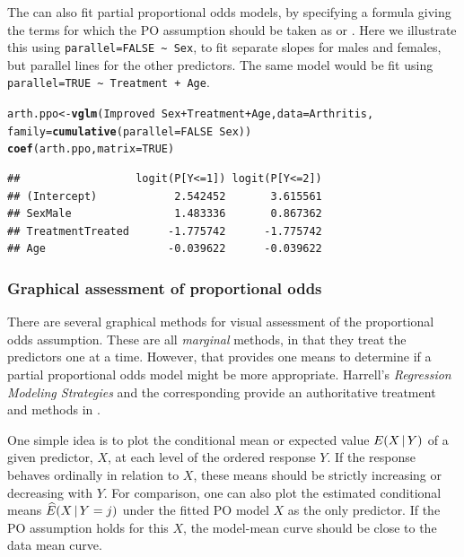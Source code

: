 \documentclass[11pt]{book}\usepackage[]{graphicx}\usepackage[]{color}
\makeatletter
\newcommand{\hlnum}[1]{\textcolor[rgb]{0.686,0.059,0.569}{#1}}%
\newcommand{\hlopt}[1]{\textcolor[rgb]{0,0,0}{#1}}%
\newcommand{\hlstd}[1]{\textcolor[rgb]{0.345,0.345,0.345}{#1}}%
\newcommand{\hlkwb}[1]{\textcolor[rgb]{0.69,0.353,0.396}{#1}}%
\newcommand{\hlkwc}[1]{\textcolor[rgb]{0.333,0.667,0.333}{#1}}%
\newcommand{\hlkwd}[1]{\textcolor[rgb]{0.737,0.353,0.396}{\textbf{#1}}}%
\newenvironment{kframe}{%
 \def\at@end@of@kframe{}%
 \ifinner\ifhmode%
  \def\at@end@of@kframe{\end{minipage}}%
  \begin{minipage}{\columnwidth}%
 \fi\fi%
 \def\FrameCommand##1{\hskip\@totalleftmargin \hskip-\fboxsep
 \colorbox{shadecolor}{##1}\hskip-\fboxsep
     \hskip-\linewidth \hskip-\@totalleftmargin \hskip\columnwidth}%
 \MakeFramed {\advance\hsize-\width
   \@totalleftmargin\z@ \linewidth\hsize
   \@setminipage}}%
 {\par\unskip\endMakeFramed%
 \at@end@of@kframe}
\newenvironment{knitrout}{}{} %
\renewenvironment{knitrout}{\small\renewcommand{\baselinestretch}{.85}}{} %
\makeatother
\begin{document}
The  can also fit partial proportional odds models, by specifying a
formula giving the terms for which the PO assumption should be taken as 
or .  Here we illustrate this using \verb|parallel=FALSE ~ Sex|, to fit
separate slopes for males and females, but parallel lines for the other predictors.
The same model would be fit using \verb|parallel=TRUE ~ Treatment + Age|.
\begin{knitrout}
\color{fgcolor}\begin{kframe}
\begin{alltt}
\hlstd{arth.ppo} \hlkwb{<-} \hlkwd{vglm}\hlstd{(Improved} \hlopt{~} \hlstd{Sex} \hlopt{+} \hlstd{Treatment} \hlopt{+} \hlstd{Age,} \hlkwc{data}\hlstd{=Arthritis,}
  \hlkwc{family} \hlstd{=} \hlkwd{cumulative}\hlstd{(}\hlkwc{parallel}\hlstd{=}\hlnum{FALSE} \hlopt{~} \hlstd{Sex))}
\hlkwd{coef}\hlstd{(arth.ppo,} \hlkwc{matrix}\hlstd{=}\hlnum{TRUE}\hlstd{)}
\end{alltt}
\begin{verbatim}
##                  logit(P[Y<=1]) logit(P[Y<=2])
## (Intercept)            2.542452       3.615561
## SexMale                1.483336       0.867362
## TreatmentTreated      -1.775742      -1.775742
## Age                   -0.039622      -0.039622
\end{verbatim}
\end{kframe}
\end{knitrout}

\subsubsection{Graphical assessment of proportional odds}

There are several graphical methods for visual assessment of the proportional odds
assumption.  These are all \emph{marginal} methods, in that they treat the predictors
one at a time.  However, that provides one means to determine if a partial
proportional odds model might be more appropriate.
Harrell's \citeyear[Ch. 13-14]{Harrell:2001} \emph{Regression Modeling Strategies}
and the corresponding  provide an authoritative treatment
and methods in \R.

One simple idea is to plot the conditional mean or expected value $E (X \, | \, Y)$
of a given predictor, $X$, at each level of
the ordered response $Y$. If the response behaves ordinally in relation to $X$,
these means should be strictly increasing or decreasing with $Y$.
For comparison, one can also plot the estimated conditional means
$\widehat{E} (X \, | \, Y = j)$ under the fitted PO model $X$ as the only predictor.
If the PO assumption holds for this $X$, the model-mean curve should be close to the
data mean curve.
\end{document}
